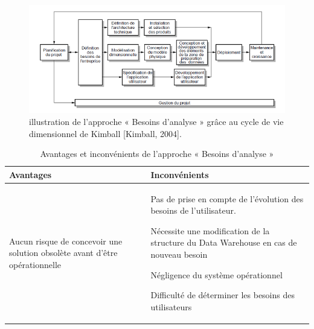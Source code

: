   \begin{figure}[h]
	\begin{center}
		\includegraphics[scale=0.85]{images/besion_analyse.png}
		\caption{illustration de l’approche « Besoins d’analyse » grâce au cycle de vie dimensionnel de Kimball [Kimball, 2004].}
		\label{synthese-cout-salarie}
	\end{center}
\end{figure}

\begin{flushleft}
	\begin{longtable}{|p{}|p{}|}
		\caption{Avantages et inconvénients de l'approche « Besoins d’analyse »} 
		\label{Transactionel vs descisionel}
		\\
		
		
		\hline 
		\textbf{Avantages} &
		\textbf{Inconvénients}
		\\
		
		\hline
		\endhead
		\hline
		\endfoot
		\hline
		 
		\begin{description}
		 \item Aucun risque de concevoir une solution obsolète avant d’être opérationnelle
		 \end{description}
		  &
		 
	   \begin{description}
		\item  Pas de prise en compte de l’évolution des besoins de l’utilisateur.
		\item Nécessite une modification de la structure du Data Warehouse en cas de nouveau besoin
		\item Négligence du système opérationnel
		\item Difficulté de déterminer les besoins des utilisateurs
		\end{description}
		\\ 	
		\hline 
	\end{longtable} 
\end{flushleft}


